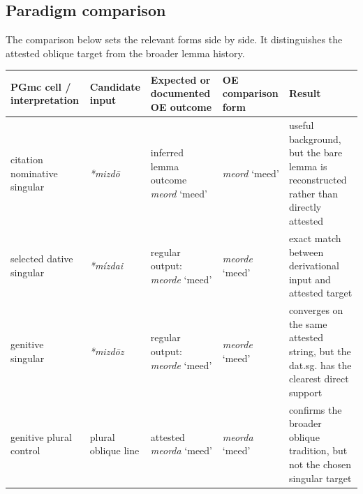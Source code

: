 \documentclass[
  british,
  a4paper,
  openany]{book}
\newcounter{none} %
\begin{document}
\subsection{Paradigm comparison}\label{paradigm-comparison-11}

The comparison below sets the relevant forms side by side. It
distinguishes the attested oblique target from the broader lemma
history.

{\def\LTcaptype{none} %
\begin{longtable}[]{@{}
  >{\raggedright\arraybackslash}p{}
  >{\raggedright\arraybackslash}p{}
  >{\raggedright\arraybackslash}p{}
  >{\raggedright\arraybackslash}p{}
  >{\raggedright\arraybackslash}p{}@{}}
\toprule\noalign{}
\begin{minipage}[b]{\linewidth}\raggedright
PGmc cell / interpretation
\end{minipage} & \begin{minipage}[b]{\linewidth}\raggedright
Candidate input
\end{minipage} & \begin{minipage}[b]{\linewidth}\raggedright
Expected or documented OE outcome
\end{minipage} & \begin{minipage}[b]{\linewidth}\raggedright
OE comparison form
\end{minipage} & \begin{minipage}[b]{\linewidth}\raggedright
Result
\end{minipage} \\
\midrule\noalign{}
\endhead
\bottomrule\noalign{}
\endlastfoot
citation nominative singular & {\emph{*mizdō}} & inferred lemma outcome
{\emph{meord}} `meed' & {\emph{meord}} `meed' & useful background, but
the bare lemma is reconstructed rather than directly attested \\
selected dative singular & {\emph{*mízdai}} & regular output:
{\emph{meorde}} `meed' & {\emph{meorde}} `meed' & exact match between
derivational input and attested target \\
genitive singular & {\emph{*mizdōz}} & regular output: {\emph{meorde}}
`meed' & {\emph{meorde}} `meed' & converges on the same attested string,
but the dat.sg. has the clearest direct support \\
genitive plural control & plural oblique line & attested {\emph{meorda}}
`meed' & {\emph{meorda}} `meed' & confirms the broader oblique
tradition, but not the chosen singular target \\
\end{longtable}
}
\end{document}
